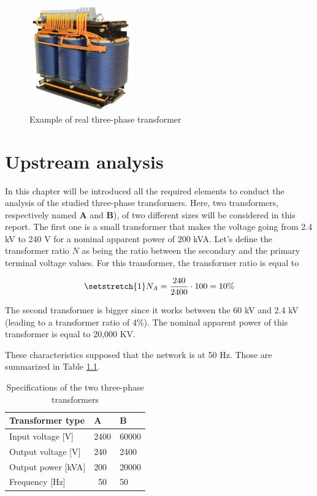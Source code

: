 \documentclass[12pt,a4paper]{report}
\begin{document}
\begin{figure}[h]
    \centering
    \includegraphics[width=0.4\textwidth]{real_transfo.jpg}
    \caption{Example of real three-phase transformer}
    \label{fig:real_transformer}
\end{figure}
\newpage
\chapter{Upstream analysis}
In this chapter will be introduced all the required elements to conduct the analysis of the studied three-phase transformers. Here, two transformers, respectively named \textbf{A} and \textbf{B}), of two different sizes will be considered in this report. The first one is a small transformer that makes the voltage going from 2.4 kV to 240 V for a nominal apparent power of 200 kVA. Let's define the transformer ratio $N$ as being the ratio between the secondary and the primary terminal voltage values. For this transformer, the transformer ratio is equal to 

\begin{equation}
\setstretch{1}
    N_A = \frac{240}{2400}\cdot 100 = 10\%
\end{equation}

The second transformer is bigger since it works between the 60 kV and 2.4 kV (leading to a transformer ratio of 4\%). The nominal apparent power of this transformer is equal to 20,000 KV.

These characteristics supposed that the network is at 50 Hz. Those are summarized in Table \ref{tab:characteristics_transfo}.

\begin{table}[h]
    \centering
\begin{tabular}{l|ll}
Transformer type   & \textbf{A}             & \textbf{B} \\ \hline
Input voltage [V]  & 2400                   & 60000      \\
Output voltage [V] & 240                    & 2400       \\
Output power [kVA] & 200                    & 20000      \\
Frequency [Hz]     & \multicolumn{1}{c}{50} & 50        
\end{tabular}
    \caption{Specifications of the two three-phase transformers}
    \label{tab:characteristics_transfo}
\end{table}
\end{document}
